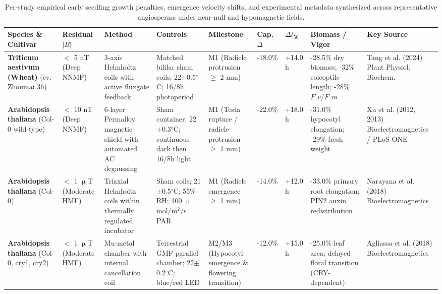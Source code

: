 \begin{table}[t]
\caption{Per-study empirical early seedling growth penalties, emergence velocity shifts, and experimental metadata synthesized across representative angiosperms under near-null and hypomagnetic fields.}\label{tab:biology}
\begin{tabular*}{\textwidth}{@{\extracolsep\fill}p{2.2cm}p{1.6cm}p{1.6cm}p{2.3cm}p{1.6cm}p{1.1cm}p{1.1cm}p{2.2cm}p{2.4cm}@{}}
\toprule
Species \& Cultivar & Residual $|B|$ & Method & Controls & Milestone & Cap. $\Delta$ & $\Delta t_{50}$ & Biomass / Vigor & Key Source \\
\midrule
\raggedright\scriptsize \textbf{Triticum aestivum (Wheat)} (cv. Zhoumai 36) & \raggedright\scriptsize $<$ 5 nT (Deep NNMF) & \raggedright\scriptsize 3-axis Helmholtz coils with active fluxgate feedback & \raggedright\scriptsize Matched bifilar sham coils; 22$\pm$0.5$^\circ$C; 16/8h photoperiod & \raggedright\scriptsize M1 (Radicle protrusion $\ge$ 2 mm) & \raggedright\scriptsize -18.0\% & \raggedright\scriptsize +14.0 h & \raggedright\scriptsize -28.5\% dry biomass; -32\% coleoptile length; -28\% $F\_v/F\_m$ & \raggedright\scriptsize Tang et al. (2024) Plant Physiol. Biochem. \\
\raggedright\scriptsize \textbf{Arabidopsis thaliana} (Col-0 wild-type) & \raggedright\scriptsize $<$ 10 nT (Deep NNMF) & \raggedright\scriptsize 6-layer Permalloy magnetic shield with automated AC degaussing & \raggedright\scriptsize Sham container; 22$\pm$0.3$^\circ$C; continuous dark then 16/8h light & \raggedright\scriptsize M1 (Testa rupture / radicle protrusion $\ge$ 1 mm) & \raggedright\scriptsize -22.0\% & \raggedright\scriptsize +18.0 h & \raggedright\scriptsize -31.0\% hypocotyl elongation; -29\% fresh weight & \raggedright\scriptsize Xu et al. (2012, 2013) Bioelectromagnetics / PLoS ONE \\
\raggedright\scriptsize \textbf{Arabidopsis thaliana} (Col-0) & \raggedright\scriptsize $<$ 1 $\upmu$T (Moderate HMF) & \raggedright\scriptsize Triaxial Helmholtz coils within thermally regulated incubator & \raggedright\scriptsize Sham coils; 21$\pm$0.5$^\circ$C; 55\% RH; 100 $\upmu$mol/m$^2$/s PAR & \raggedright\scriptsize M1 (Radicle emergence $\ge$ 1 mm) & \raggedright\scriptsize -14.0\% & \raggedright\scriptsize +12.0 h & \raggedright\scriptsize -33.0\% primary root elongation; PIN2 auxin redistribution & \raggedright\scriptsize Narayana et al. (2018) Bioelectromagnetics \\
\raggedright\scriptsize \textbf{Arabidopsis thaliana} (Col-0, cry1, cry2) & \raggedright\scriptsize $<$ 1 $\upmu$T (Moderate HMF) & \raggedright\scriptsize Mu-metal chamber with internal cancellation coil & \raggedright\scriptsize Terrestrial GMF parallel chamber; 22$\pm$0.2$^\circ$C; blue/red LED & \raggedright\scriptsize M2/M3 (Hypocotyl emergence \& flowering transition) & \raggedright\scriptsize -12.0\% & \raggedright\scriptsize +15.0 h & \raggedright\scriptsize -25.0\% leaf area; delayed floral transition (CRY-dependent) & \raggedright\scriptsize Agliassa et al. (2018) Bioelectromagnetics \\

\end{tabular*}
\end{table}

